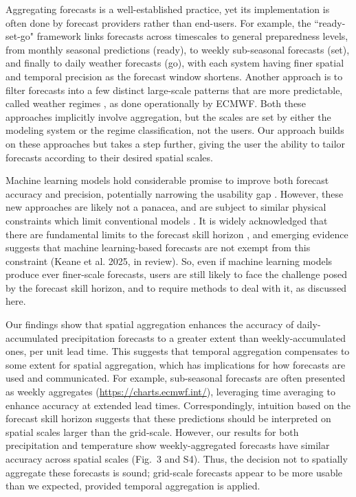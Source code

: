 \documentclass[preprint,12pt,authoryear]{elsarticle}
\begin{document}
Aggregating forecasts is a well-established practice, yet its implementation is often done by forecast providers rather than end-users. For example, the ``ready-set-go" framework \citep{Goddard2014} links forecasts across timescales to general preparedness levels, from monthly seasonal predictions (ready), to weekly sub-seasonal forecasts (set), and finally to daily weather forecasts (go), with each system having finer spatial and temporal precision as the forecast window shortens. Another approach is to filter forecasts into a few distinct large-scale patterns that are more predictable, called weather regimes \citep{Michelangeli1995}, as done operationally by ECMWF. Both these approaches implicitly involve aggregation, but the scales are set by either the modeling system or the regime classification, not the users. Our approach builds on these approaches but takes a step further, giving the user the ability to tailor forecasts according to their desired spatial scales. 



Machine learning models hold considerable promise to improve both forecast accuracy and precision, potentially narrowing the usability gap \citep{Eyring2024}. However, these new approaches are likely not a panacea, and are subject to similar physical constraints which limit conventional models \citep{Benbouallegue2024}. It is widely acknowledged that there are fundamental limits to the forecast skill horizon \citep{Lorenz1969, Palmer2014}, and emerging evidence suggests that machine learning-based forecasts are not exempt from this constraint (Keane et al. 2025, in review). So, even if machine learning models produce ever finer-scale forecasts, users are still likely to face the challenge posed by the forecast skill horizon, and to require methods to deal with it, as discussed here. 

Our findings show that spatial aggregation enhances the accuracy of daily-accumulated precipitation forecasts to a greater extent than weekly-accumulated ones, per unit lead time. This suggests that temporal aggregation compensates to some extent for spatial aggregation, which has implications for how forecasts are used and communicated. For example, sub-seasonal forecasts are often presented as weekly aggregates (\url{https://charts.ecmwf.int/}), leveraging time averaging to enhance accuracy at extended lead times. Correspondingly, intuition based on the forecast skill horizon suggests that these predictions should be interpreted on spatial scales larger than the grid-scale. However, our results for both precipitation and temperature show weekly-aggregated forecasts have similar accuracy across spatial scales (Fig.~3 and S4). Thus, the decision not to spatially aggregate these forecasts is sound; grid-scale forecasts appear to be more usable than we expected, provided temporal aggregation is applied.  
\end{document}
